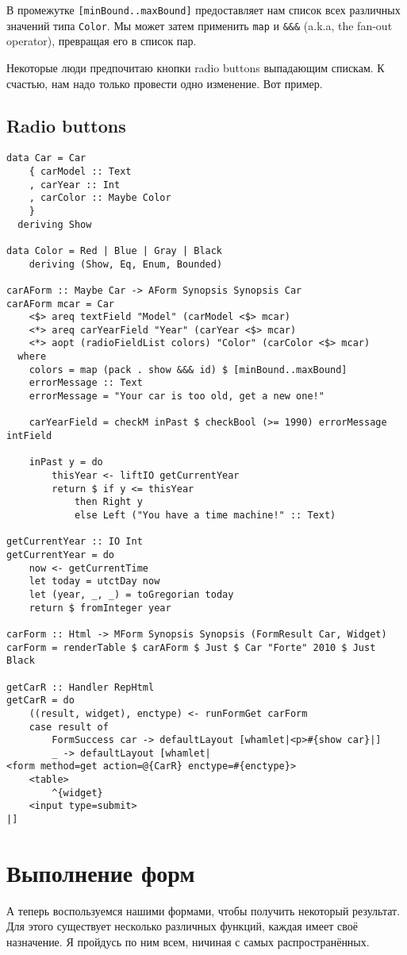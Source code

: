 В промежутке \lstinline'[minBound..maxBound]' предоставляет нам список всех различных
значений типа \lstinline'Color'. Мы может затем применить \lstinline'map' и 
\lstinline'&&&' (a.k.a, the fan-out operator), превращая его в список пар.

Некоторые люди предпочитаю кнопки radio buttons выпадающим спискам. К счастью, нам надо
только провести одно изменение. Вот пример.

\subsection{Radio buttons}
\begin{lstlisting}
data Car = Car
    { carModel :: Text
    , carYear :: Int
    , carColor :: Maybe Color
    }
  deriving Show

data Color = Red | Blue | Gray | Black
    deriving (Show, Eq, Enum, Bounded)

carAForm :: Maybe Car -> AForm Synopsis Synopsis Car
carAForm mcar = Car
    <$> areq textField "Model" (carModel <$> mcar)
    <*> areq carYearField "Year" (carYear <$> mcar)
    <*> aopt (radioFieldList colors) "Color" (carColor <$> mcar)
  where
    colors = map (pack . show &&& id) $ [minBound..maxBound]
    errorMessage :: Text
    errorMessage = "Your car is too old, get a new one!"

    carYearField = checkM inPast $ checkBool (>= 1990) errorMessage intField

    inPast y = do
        thisYear <- liftIO getCurrentYear
        return $ if y <= thisYear
            then Right y
            else Left ("You have a time machine!" :: Text)

getCurrentYear :: IO Int
getCurrentYear = do
    now <- getCurrentTime
    let today = utctDay now
    let (year, _, _) = toGregorian today
    return $ fromInteger year

carForm :: Html -> MForm Synopsis Synopsis (FormResult Car, Widget)
carForm = renderTable $ carAForm $ Just $ Car "Forte" 2010 $ Just Black

getCarR :: Handler RepHtml
getCarR = do
    ((result, widget), enctype) <- runFormGet carForm
    case result of
        FormSuccess car -> defaultLayout [whamlet|<p>#{show car}|]
        _ -> defaultLayout [whamlet|
<form method=get action=@{CarR} enctype=#{enctype}>
    <table>
        ^{widget}
    <input type=submit>
|]
\end{lstlisting}

\section{Выполнение форм}
А теперь воспользуемся нашими формами, чтобы получить некоторый результат. Для этого
существует несколько различных функций, каждая имеет своё назначение. Я пройдусь по ним
всем, ничиная с самых распространённых.

